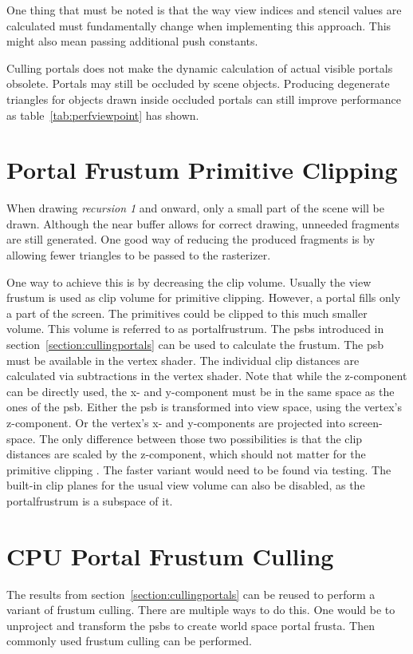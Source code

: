 One thing that must be noted is that the way view indices and stencil values are calculated must fundamentally change when implementing this approach. This might also mean passing additional push constants.

Culling portals does not make the dynamic calculation of actual visible portals obsolete. Portals may still be occluded by scene objects. Producing degenerate triangles for objects drawn inside occluded portals can still improve performance as table~\ref{tab:perfviewpoint} has shown.

\section{Portal Frustum Primitive Clipping}
\label{section:portalprimitiveclipping}

When drawing \textit{recursion 1} and onward, only a small part of the scene will be drawn. Although the near buffer allows for correct drawing, unneeded fragments are still generated. One good way of reducing the produced fragments is by allowing fewer triangles to be passed to the rasterizer. 

One way to achieve this is by decreasing the clip volume. Usually the view frustum is used as clip volume for primitive clipping. However, a portal fills only a part of the screen. The primitives could be clipped to this much smaller volume. This volume is referred to as \gls{portalfrustrum}. The \glspl{psb} introduced in section~\ref{section:cullingportals} can be used to calculate the frustum. The \gls{psb} must be available in the vertex shader. The individual clip distances are calculated via subtractions in the vertex shader. Note that while the z-component can be directly used, the x- and y-component must be in the same space as the ones of the \gls{psb}. Either the \gls{psb} is transformed into view space, using the vertex's z-component. Or the vertex's x- and y-components are projected into screen-space. The only difference between those two possibilities is that the clip distances are scaled by the z-component, which should not matter for the primitive clipping \cite{khronos:vulkan:spec1.1}. The faster variant would need to be found via testing. The built-in clip planes for the usual view volume can also be disabled, as the \gls{portalfrustrum} is a subspace of it.

\section{CPU Portal Frustum Culling}
\label{section:portalfrustumculling}
The results from section~\ref{section:cullingportals} can be reused to perform a variant of frustum culling. There are multiple ways to do this. One would be to unproject and transform the \glspl{psb} to create world space portal frusta. Then commonly used frustum culling can be performed.

